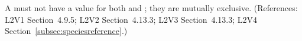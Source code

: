 A \SpeciesReference must not have a value for both 
and ; they are mutually exclusive.  (References:
L2V1 Section~4.9.5; L2V2 Section~4.13.3; L2V3 Section~4.13.3; L2V4 Section~\ref{subsec:speciesreference}.)
